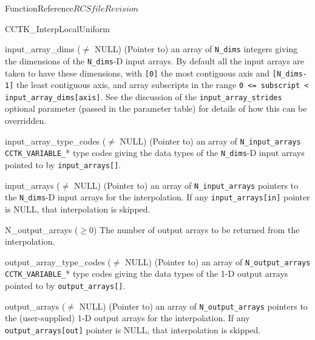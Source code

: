\begin{cactuspart}{FunctionReference}{$RCSfile$}{$Revision$}
\begin{FunctionDescription}{CCTK\_InterpLocalUniform}
\begin{ParameterSection}
\begin{Parameter}{input\_array\_dims ($\ne$ NULL)}
\hbox{}
(Pointer to) an array of \verb|N_dims| integers giving the dimensions
of the \verb|N_dims|-D input arrays.  By default all the input arrays
are taken to have these dimensions, with \verb|[0]| the most contiguous
axis and \verb|[N_dims-1]| the least contiguous axis, and array subscripts
in the range \verb|0 <= subscript < input_array_dims[axis]|.  See the
discussion of the \verb|input_array_strides| optional parameter (passed
in the parameter table) for details of how this can be overridden.
\end{Parameter}
\begin{Parameter}{input\_array\_type\_codes ($\ne$ NULL)}
\hbox{}
(Pointer to) an array of \verb|N_input_arrays| \verb|CCTK_VARIABLE_|*
type codes giving the data types of the \verb|N_dims|-D input arrays
pointed to by \verb|input_arrays[]|.
\end{Parameter}
\begin{Parameter}{input\_arrays ($\ne$ NULL)}
\hbox{}
(Pointer to) an array of \verb|N_input_arrays| pointers to the
\verb|N_dims|-D input arrays for the interpolation.  If any
\verb|input_arrays[in]| pointer is NULL, that interpolation is skipped.
\end{Parameter}
\begin{Parameter}{N\_output\_arrays ($\ge 0$)}
\hbox{}
The number of output arrays to be returned from the interpolation.
\end{Parameter}
\begin{Parameter}{output\_array\_type\_codes ($\ne$ NULL)}
\hbox{}
(Pointer to) an array of \verb|N_output_arrays| \verb|CCTK_VARIABLE_|*
type codes giving the data types of the 1-D output arrays pointed to by
\verb|output_arrays[]|.
\end{Parameter}
\begin{Parameter}{output\_arrays ($\ne$ NULL)}
\hbox{}
(Pointer to) an array of \verb|N_output_arrays| pointers to the
(user-supplied) 1-D output arrays for the interpolation.  If any
\verb|output_arrays[out]| pointer is NULL, that interpolation is skipped.
\end{Parameter}
\end{ParameterSection}


\end{FunctionDescription}
\end{cactuspart}
